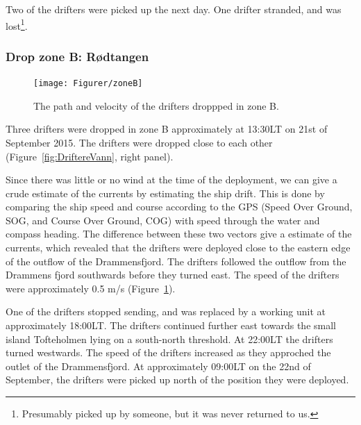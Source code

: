 \documentclass[12pt,a4paper,english]{article}
\begin{document}
Two of the drifters were picked up the next day. One drifter stranded, and was lost\footnote{Presumably picked up by someone, but it was never returned to us.}. 

\subsubsection{Drop zone B: R\o dtangen}
\label{sect:ZoneB}
%
\begin{figure}[ht]
\centerline{
\texttt{[image: Figurer/zoneB]}}
\caption{\small
The path and velocity of the drifters droppped in zone B.}
\label{fig:ZoneB}
\end{figure}
%
%
Three drifters were dropped in zone B approximately at 13:30LT on 21st of September 2015. The drifters were dropped close to each other (Figure~\ref{fig:DriftereVann}, right panel).

Since there was little or no wind at the time of the deployment, we can give a crude estimate of the currents by estimating the ship drift. This is done by comparing the ship speed and course according to the GPS (Speed Over Ground, SOG, and Course Over Ground, COG) with speed through the water and compass heading. The difference between these two vectors give a estimate of the currents, which revealed that the drifters were deployed close to the eastern edge of the outflow of the Drammensfjord. The drifters followed the outflow from the Drammens fjord southwards before they turned east. The speed of the drifters were approximately 0.5 m/s (Figure~\ref{fig:ZoneB}). %

One of the drifters stopped sending, and was replaced by a working unit at approximately 18:00LT. The drifters continued further east towards the small island Tofteholmen lying on a south-north threshold. At 22:00LT the drifters turned westwards. The speed of the drifters increased as they approched the outlet of the Drammensfjord. %
At approximately 09:00LT on the 22nd of September, the drifters were picked up north of the position they were deployed.
\end{document}
